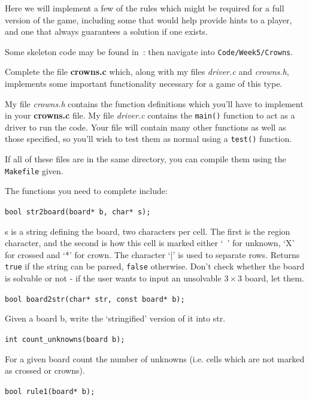\begin{exercise}

Here we will implement a few of the rules which might be required
for a full version of the game, including some that would help
provide hints to a player, and one that always guarantees a solution if
one exists.

\noindent Some skeleton code may be found in~:
 then navigate
into \verb^Code/Week5/Crowns^.


Complete the file {\bf crowns.c} which, along with
my files {\em driver.c} and {\em crowns.h}, implements some important
functionality necessary for a game of this type.

\noindent My file {\em crowns.h} contains the function definitions
which you'll have to implement in your {\bf crowns.c} file. My file
{\em driver.c} contains the \verb^main()^ function to act as a driver to
run the code. Your file will contain many other functions as well as those
specified, so you'll wish to test them as normal using a \verb^test()^
function.

\noindent If all of these files are in the same directory, you can
compile them using the \verb^Makefile^ given.

\noindent The functions you need to complete include:

\vspace{1em}
\verb^bool str2board(board* b, char* s);^

s is a string defining the board, two characters per cell.
The first is the region character, and the second is how
this cell is marked either `~' for unknown, `X' for crossed
and `*' for crown. The character `|' is used to separate
rows. Returns \verb^true^ if the string can be parsed, \verb^false^
otherwise. Don't check whether the board is solvable or not - if the
user wants to input an unsolvable $3\times3$ board, let them.

\vspace{1em}
\verb^bool board2str(char* str, const board* b);^

Given a board b, write the `stringified' version of it
into str.

\vspace{1em}
\verb^int count_unknowns(board b);^

For a given board count the number of unknowns
(i.e. cells which are not marked as crossed or crowns).

\vspace{1em}
\verb^bool rule1(board* b);^


\end{exercise}
